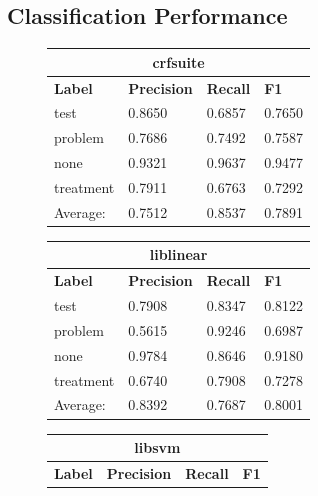 \documentclass[preprint]{style}
\begin{document}
\subsection{Classification Performance}

\begin{figure}[t]
\begin{center}
	\begin{tabular}{|l|l|l|l|}
	\hline
	\multicolumn{4}{|c|}{\bf crfsuite} \\ \hline
	{\bf Label} & {\bf Precision} & {\bf Recall} & {\bf F1} \\ \hline
	
test & 0.8650 &	0.6857 &	0.7650 \\ \hline
problem & 0.7686 &	0.7492	& 0.7587 \\ \hline
none & 0.9321 & 	0.9637 &	0.9477 \\ \hline
treatment  & 0.7911 &	0.6763 &	0.7292 \\ \hline
	
	\hline
	Average: & 0.7512 &	 0.8537 &	0.7891 \\
	\hline
	\end{tabular}
\end{center}


\begin{center}
	\begin{tabular}{|l|l|l|l|}
	\hline
	\multicolumn{4}{|c|}{\bf liblinear} \\ \hline
	{\bf Label} & {\bf Precision} & {\bf Recall} & {\bf F1} \\ \hline

test  & 0.7908 & 0.8347 & 	0.8122 \\ \hline
problem  & 0.5615 & 	0.9246 &	0.6987 \\ \hline
none  & 0.9784	& 0.8646 &	0.9180 \\ \hline
treatment  & 0.6740 &	0.7908	& 0.7278 \\ \hline

	\hline
	Average: & 0.8392 &	 0.7687  &	0.8001 \\
	\hline
	\end{tabular}
\end{center}
	
	
	
		
\begin{center}	
	\begin{tabular}{|l|l|l|l|}
	\hline
	\multicolumn{4}{|c|}{\bf libsvm} \\ \hline
	{\bf Label} & {\bf Precision} & {\bf Recall} & {\bf F1} \\ \hline


\end{tabular}
\end{center}
\end{figure}
\end{document}
